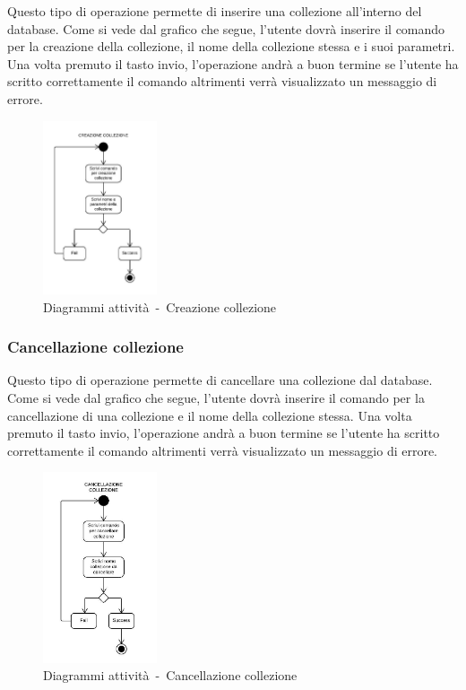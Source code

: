 \documentclass{scalatekids-article}
\begin{document}
Questo tipo di operazione permette di inserire una collezione all'interno del
database. Come si vede dal grafico che segue, l'utente dovrà inserire il
comando per la creazione della collezione, il nome della collezione stessa e i
suoi parametri. Una volta premuto il tasto invio, l'operazione andrà a buon
termine se l'utente ha scritto correttamente il comando altrimenti verrà
visualizzato un messaggio di errore.

\begin{figure}[H]
  \begin{center}
    \includegraphics[width=0.3\textwidth, keepaspectratio]{img/diagrammiAttivita/creazioneCollezione.jpeg}
    \caption{Diagrammi attività\ -\ Creazione collezione}
  \end{center}
\end{figure}

\subsubsection{Cancellazione collezione}

Questo tipo di operazione permette di cancellare una collezione dal database.
Come si vede dal grafico che segue, l'utente dovrà inserire il comando per la
cancellazione di una collezione e il nome della collezione stessa. Una volta
premuto il tasto invio, l'operazione andrà a buon termine se l'utente ha
scritto correttamente il comando altrimenti verrà visualizzato un messaggio di
errore.

\begin{figure}[H]
  \begin{center}
    \includegraphics[width=0.3\textwidth, keepaspectratio]{img/diagrammiAttivita/cancCollezione.jpeg}
    \caption{Diagrammi attività\ -\ Cancellazione collezione}
  \end{center}
\end{figure}
\end{document}
